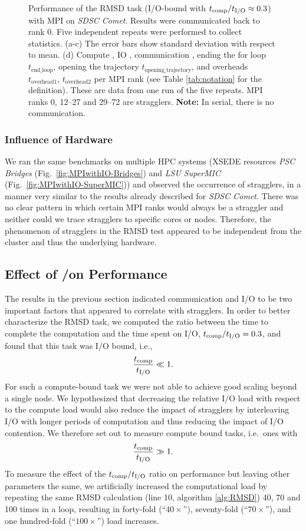 \begin{figure}
\caption{Performance of the RMSD task (I/O-bound with ${t}_{\text{comp}}/{t}_{\text{I/O}} \approx 0.3$) with MPI on \emph{SDSC Comet}.
Results were communicated back to rank 0. Five independent repeats were performed to collect statistics. (a-c) The error bars show
standard deviation with respect to mean. (d) Compute \tcomp, IO \tIO, communication \tcomm, ending the for loop $t_{\text{end\_loop}}$,
  opening the trajectory $t_{\text{opening\_trajectory}}$, and overheads $t_{\text{overhead1}}$, $t_{\text{overhead2}}$ per MPI rank (see Table \ref{tab:notation} for the definition).
These are data from one run of the five repeats. MPI ranks 0, 12--27 and 29--72 are stragglers. \textbf{Note:} In serial, there is no communication.}
\label{fig:MPIwithIO}
\end{figure} 

\subsubsection*{Influence of Hardware}
We ran the same benchmarks on multiple HPC systems (XSEDE resources \emph{PSC Bridges} (Fig.~\ref{fig:MPIwithIO-Bridges}) and \emph{LSU SuperMIC} (Fig.~\ref{fig:MPIwithIO-SuperMIC})) and observed the occurrence of stragglers, in a manner very similar to the results already described for \emph{SDSC Comet}.
There was no clear pattern in which certain MPI ranks would always be a straggler and neither could we trace stragglers to specific cores or nodes. 
Therefore, the phenomenon of stragglers in the RMSD test appeared to be independent from the cluster and thus the underlying hardware.


\subsection{Effect of \tcomp/\tIO on Performance}
\label{bound}

The results in the previous section indicated communication and I/O to be two important factors that appeared to correlate with stragglers. 
In order to better characterize the RMSD task, we computed the ratio between the time to complete the computation and the time spent on I/O, ${t}_{\text{comp}}/{t}_{\text{I/O}} = 0.3$, and found that this task was I/O bound, i.e.,
\begin{gather*}
  \frac{{t}_{\text{comp}}}{{t}_{\text{I/O}}} \ll 1.
\end{gather*}
For such a compute-bound task we were not able to achieve good scaling beyond a single node. 
We hypothesized that decreasing the relative I/O load with respect to the compute load would also reduce the impact of stragglers by interleaving I/O with longer periods of computation and thus reducing the impact of I/O contention.
We therefore set out to measure compute bound tasks, i.e.\ ones with
\begin{gather*}
  \frac{{t}_{\text{comp}}}{{t}_{\text{I/O}}} \gg 1.
\end{gather*}
To measure the effect of the ${t}_{\text{comp}}/{t}_{\text{I/O}}$ ratio on performance but leaving other parameters the same, we artificially increased the computational load by repeating the same RMSD calculation (line 10, algorithm \ref{alg:RMSD}) 40, 70 and 100 times in a loop, resulting in forty-fold (``$40\times$''), seventy-fold (``$70\times$''), and one hundred-fold (``$100\times$'') load increases.


